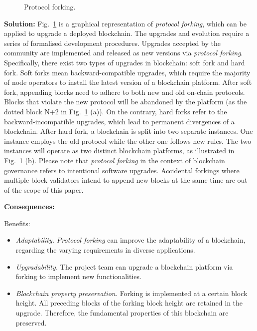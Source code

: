 \documentclass{article}
\begin{document}
\begin{figure}[!ht]
	\centering
    \caption{Protocol forking.}
	\label{pic:forking}
\end{figure}

\vspace{0.5em}\noindent \textbf{Solution:} Fig.~\ref{pic:forking} is a graphical representation of \textit{protocol forking}, which can be applied to upgrade a deployed blockchain. The upgrades and evolution require a series of formalised development procedures. Upgrades accepted by the community are implemented and released as new versions via \textit{protocol forking}. Specifically, there exist two types of upgrades in blockchain: soft fork and hard fork. Soft forks mean backward-compatible upgrades, which require the majority of node operators to install the latest version of a blockchain platform. After soft fork, appending blocks need to adhere to both new and old on-chain protocols. Blocks that violate the new protocol will be abandoned by the platform (as the dotted block N+2 in Fig.~\ref{pic:forking} (a)). On the contrary, hard forks refer to the backward-incompatible upgrades, which lead to permanent divergences of a blockchain. After hard fork, a blockchain is split into two separate instances. One instance employs the old protocol while the other one follows new rules. The two instances will operate as two distinct blockchain platforms, as illustrated in Fig.~\ref{pic:forking} (b). Please note that \textit{protocol forking} in the context of blockchain governance refers to intentional software upgrades. Accidental forkings where multiple block validators intend to append new blocks at the same time are out of the scope of this paper.


\vspace{0.5em}\noindent \textbf{Consequences:} 

Benefits:
\begin{itemize}
  \item \textit{Adaptability.} \textit{Protocol forking} can improve the adaptability of a blockchain, regarding the varying requirements in diverse applications.
  
  \item \textit{Upgradability.} The project team can upgrade a blockchain platform via forking to implement new functionalities.
  
  \item \textit{Blockchain property preservation.} Forking is implemented at a certain block height. All preceding blocks of the forking block height are retained in the upgrade. Therefore, the fundamental properties of this blockchain are preserved.
\end{itemize}
\end{document}

